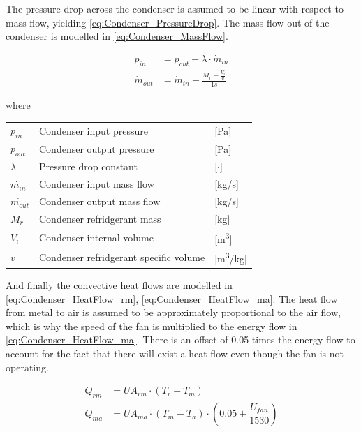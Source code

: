 The pressure drop across the condenser is assumed to be linear with respect to mass flow, yielding \cref{eq:Condenser_PressureDrop}.
The mass flow out of the condenser is modelled in \cref{eq:Condenser_MassFlow}.


\begin{align}
	p_{in} 	& =  p_{out} - \lambda \cdot \dot{m}_{in}  				\label{eq:Condenser_PressureDrop}\\
	\dot{m}_{out}		& = \dot{m}_{in} + \frac{M_r - \frac{V_i}{v}}{1s}		\label{eq:Condenser_MassFlow}
\end{align}

where

\begin{center}
	\begin{tabular}{l p{8cm} l}
		$p_{in}$				&	Condenser input pressure					& [\si{Pa}] \\
		$p_{out}$				&	Condenser output pressure					& [\si{Pa}] \\
		$\lambda$				& 	Pressure drop constant	 					& [$\cdot$] \\
		$\dot{m_{in}}$			& 	Condenser input mass flow 					& [\si{kg}/\si{s}] \\
		$\dot{m_{out}}$			& 	Condenser output mass flow 					& [\si{kg}/\si{s}] \\
		$M_{r}$					&	Condenser refridgerant mass					& [\si{kg}] \\
		$V_{i}$					&	Condenser internal volume					& [\si{m^3}] \\
		$v$						&	Condenser refridgerant specific volume		& [\si{m^3}/\si{kg}] \\
	\end{tabular}
\end{center}


And finally the convective heat flows are modelled in \cref{eq:Condenser_HeatFlow_rm}, \cref{eq:Condenser_HeatFlow_ma}. The heat flow from metal to air is assumed to be approximately proportional to the air flow, which is why the speed of the fan is multiplied to the energy flow in \cref{eq:Condenser_HeatFlow_ma}. There is an offset of 0.05 times the energy flow to account for the fact that there will exist a heat flow even though the fan is not operating.

\begin{align}
	Q_{rm}	 			& = U A_{rm} \cdot (T_r - T_m)							\label{eq:Condenser_HeatFlow_rm}\\
	Q_{ma}	 			& = U A_{ma} \cdot (T_m - T_a)\cdot (0.05 + \dfrac{U_{fan}}{1530})				\label{eq:Condenser_HeatFlow_ma}
\end{align}

